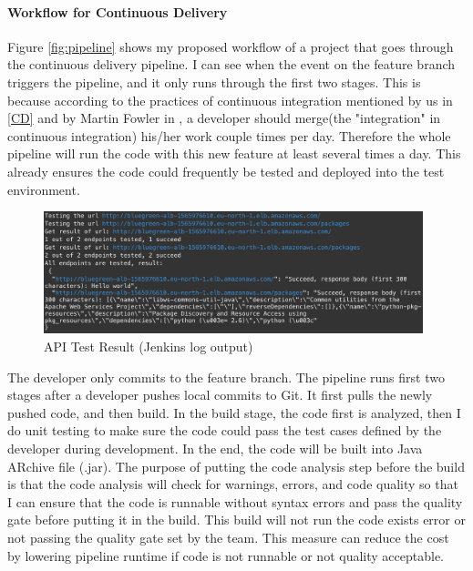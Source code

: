\paragraph[]{Workflow for Continuous Delivery}
\label{workflow}
Figure \ref{fig:pipeline} shows my proposed workflow of a project that goes through the continuous delivery pipeline.
I can see when the event on the feature branch triggers the pipeline, and it only runs through the first two stages. This is because according to the practices of continuous integration mentioned by us in \ref{CD} and by Martin Fowler in \cite{fowler2006continuous}, a developer should merge(the "integration" in continuous integration) his/her work couple times per day. Therefore the whole pipeline will run the code with this new feature at least several times a day. This already ensures the code could frequently be tested and deployed into the test environment.
\begin{figure}[!h]
     \centering
     \includegraphics[width=0.98\textwidth]{pics/test_result.png}
     \caption{API Test Result (Jenkins log output)}
     \label{fig:test-result}
    \end{figure}
\par
The developer only commits to the feature branch. The pipeline runs first two stages after a developer pushes local commits to Git. It first pulls the newly pushed code, and then build. In the build stage, the code first is analyzed, then I do unit testing to make sure the code could pass the test cases defined by the developer during development. In the end, the code will be built into Java ARchive file (.jar). The purpose of putting the code analysis step before the build is that the code analysis will check for warnings, errors, and code quality so that I can ensure that the code is runnable without syntax errors and pass the quality gate before putting it in the build. This build will not run the code exists error or not passing the quality gate set by the team. This measure can reduce the cost by lowering pipeline runtime if code is not runnable or not quality acceptable. 
\par
